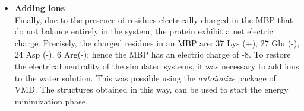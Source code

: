 \begin{itemize}
\item \textbf{Adding ions}\\
Finally, due to the presence of residues electrically charged in the MBP that do not balance entirely in the system, the protein exhibit a net electric charge. Precisely, the charged residues in an MBP are: 37 Lys (+), 27 Glu (-), 24 Asp (-), 6 Arg(-); hence the MBP has an electric charge of -8. To restore the electrical neutrality of the simulated systems, it was necessary to add ions to the water solution. This was possible using the \textit{autoionize} package of VMD. The structures obtained in this way, can be used to start the energy minimization phase.


\end{itemize}
